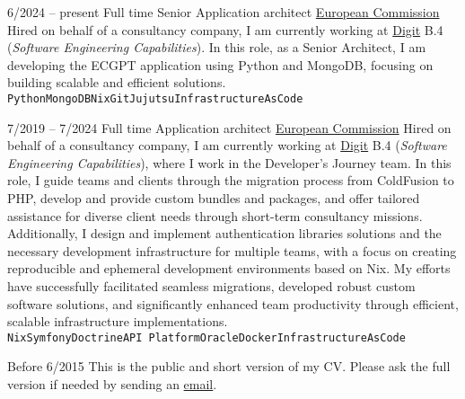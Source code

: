 \begin{entrylist}
	\entry
		{6/2024 -- present}
        {Full time}
		{Senior Application architect}
        {\href{https://ec.europa.eu/}{European Commission}}
        {
            Hired on behalf of a consultancy company, I am currently working at
            \href{https://ec.europa.eu/info/departments/informatics_en}{Digit} B.4 (\textit{Software Engineering Capabilities}).
			In this role, as a Senior Architect, I am developing the ECGPT application using Python and MongoDB,
			focusing on building scalable and efficient solutions.
			\\ \texttt{Python}\slashsep\texttt{MongoDB}\slashsep\texttt{Nix}\slashsep\texttt{Git}\slashsep\texttt{Jujutsu}\slashsep\texttt{InfrastructureAsCode}
        }

	\entry
		{7/2019 -- 7/2024}
        {Full time}
		{Application architect}
        {\href{https://ec.europa.eu/}{European Commission}}
        {
            Hired on behalf of a consultancy company, I am currently working at
            \href{https://ec.europa.eu/info/departments/informatics_en}{Digit} B.4 (\textit{Software Engineering Capabilities}),
            where I work in the Developer's Journey team. In this role, I guide teams and clients
            through the migration process from ColdFusion to PHP, develop and provide custom
            bundles and packages, and offer tailored assistance for diverse client needs through
            short-term consultancy missions. Additionally, I design and implement authentication libraries
            solutions and the necessary development infrastructure for multiple teams, with
            a focus on creating reproducible and ephemeral development environments based on Nix.
            My efforts have successfully facilitated seamless migrations, developed robust custom
            software solutions, and significantly enhanced team productivity through efficient,
            scalable infrastructure implementations.
			\\ \texttt{Nix}\slashsep\texttt{Symfony}\slashsep\texttt{Doctrine}\slashsep\texttt{API Platform}\slashsep\texttt{Oracle}\slashsep\texttt{Docker}\slashsep\texttt{InfrastructureAsCode}
        }

    \entry
        {\color{black!50}Before 6/2015}
        {}
        {}
        {}
        {\footnotesize{\color{black!50}This is the public and short version of my CV. Please ask the full version if needed by sending an \href{mailto:pol.dellaiera@protonmail.com}{email}.}}
\end{entrylist}

